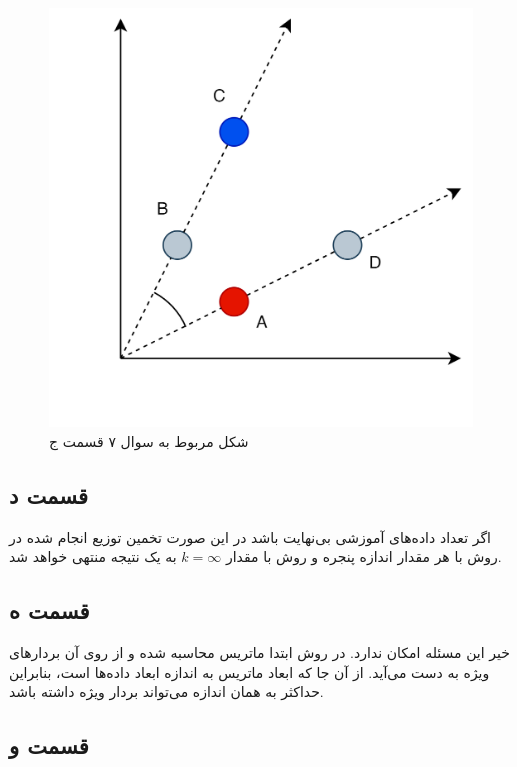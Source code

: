 \documentclass{article}
\begin{document}
\begin{figure}[h]
    \centering
    \includegraphics[scale=0.4]{images/q7/partc.png}
    \caption{شکل مربوط به سوال ۷ قسمت ج}
    \label{distances}
\end{figure}

\subsection*{قسمت د}

اگر تعداد داده‌های آموزشی بی‌نهایت باشد در این صورت تخمین توزیع انجام شده در روش 
با هر مقدار اندازه پنجره و روش  با مقدار $k=\infty$ به یک نتیجه منتهی خواهد شد.

\subsection*{قسمت ه}

خیر این مسئله امکان ندارد. در روش  ابتدا ماتریس  محاسبه شده و از روی آن
بردار‌های ویژه به دست می‌آید. از آن جا که ابعاد ماتریس  به اندازه ابعاد داده‌ها است،
بنابراین حداکثر به همان اندازه می‌تواند بردار ویژه داشته باشد.

\subsection*{قسمت و}
\end{document}
